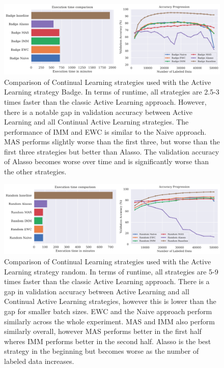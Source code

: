 \begin{figure} [ht]
    \centering
    \includegraphics[width=\linewidth]{images/results_CAL/Badge_CAL_2000b.png}
    \caption[Continual Active Learning Badge 2000 batch size]{Comparison of Continual Learning strategies used with the Active Learning strategy Badge. In terms of runtime, all
    strategies are 2.5-3 times faster than the classic Active Learning approach. However, there is a notable gap in validation accuracy between Active Learning and all Continual
    Active Learning strategies. The performance of IMM and EWC is similar to the Naive approach. MAS performs slightly worse than the first three, but 
    worse than the first three strategies but better than Alasso. The validation accuracy of Alasso becomes worse over time and is significantly worse than the other strategies.}
    \label{fig:Evaluation:Results:CAL:Badge2000}
\end{figure}





\begin{figure} [ht]
    \centering
    \includegraphics[width=\linewidth]{images/results_CAL/Random_CAL_4000b.png}
    \caption[Continual Active Learning Random 4000 batch size]{Comparison of Continual Learning strategies used with the Active Learning strategy random. In terms of runtime, all
    strategies are 5-9 times faster than the classic Active Learning approach. There is a gap in validation accuracy between Active Learning and all Continual
    Active Learning strategies, however this is lower than the gap for smaller batch sizes. EWC and the Naive approach perform similarly across the whole experiment. MAS and IMM
    also perform similarly overall, however MAS performs better in the first half wheres IMM performs better in the second half. Alasso is the best strategy in the beginning but 
    becomes worse as the number of labeled data increases.}
    \label{fig:Evaluation:Results:CAL:Random4000}
\end{figure}

